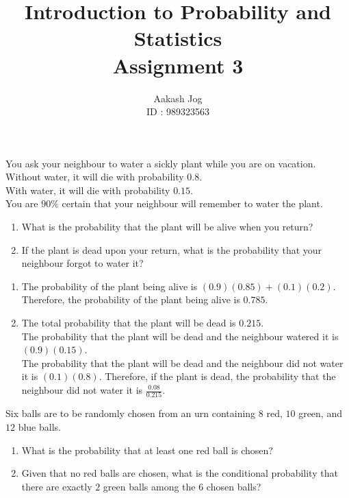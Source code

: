 \documentclass[fleqn, a4paper, 11pt, oneside]{amsart}
\title
[
	Introduction to Probability and Statistics : Assignment 3
]
{
	Introduction to Probability and Statistics\\
	Assignment 3
}
\author
{
	Aakash Jog\\
	ID : 989323563
}
\date{\formatdate{23}{3}{2016}}
\theoremstyle{definition}
\theoremstyle{theorem}
\begin{document}
\maketitle

\begin{question}
	You ask your neighbour to water a sickly plant while you are on vacation.\\
	Without water, it will die with probability $0.8$.\\
	With water, it will die with probability $0.15$.\\
	You are $90\%$ certain that your neighbour will remember to water the plant.\\
	\begin{enumerate}
		\item What is the probability that the plant will be alive when you return?
		\item If the plant is dead upon your return, what is the probability that your neighbour forgot to water it?
	\end{enumerate}
\end{question}

\begin{solution}
	\begin{enumerate}[leftmargin=*]
		\item
			The probability of the plant being alive is $(0.9) (0.85) + (0.1) (0.2)$.\\
			Therefore, the probability of the plant being alive is $0.785$.
		\item
			The total probability that the plant will be dead is $0.215$.\\
			The probability that the plant will be dead and the neighbour watered it is $(0.9) (0.15)$.\\
			The probability that the plant will be dead and the neighbour did not water it is $(0.1) (0.8)$.
			Therefore, if the plant is dead, the probability that the neighbour did not water it is $\frac{0.08}{0.215}$.
	\end{enumerate}
\end{solution}

\begin{question}
	Six balls are to be randomly chosen from an urn containing $8$ red, $10$ green, and $12$ blue balls.
	\begin{enumerate}
		\item What is the probability that at least one red ball is chosen?
		\item Given that no red balls are chosen, what is the conditional probability that there are exactly $2$ green balls among the $6$ chosen balls?
	\end{enumerate}
\end{question}
\end{document}
